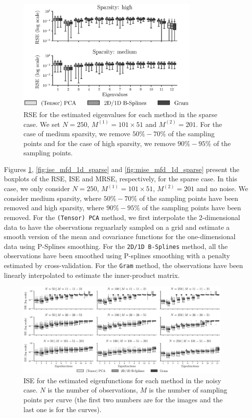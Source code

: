 \begin{figure}
    \centering
    \includegraphics[width=0.8\textwidth]{AE_sparse}
    \caption{RSE for the estimated eigenvalues for each method in the sparse case. We set $N = 250$, $M^{(1)} = 101 \times 51$ and $M^{(2)} = 201$. For the case of medium sparsity, we remove $50\%-70\%$ of the sampling points and for the case of high sparsity, we remove $90\%-95\%$ of the sampling points.}
    \label{fig:logAE_mfd_1d_sparse}
\end{figure}


Figures \ref{fig:logAE_mfd_1d_sparse}, \ref{fig:ise_mfd_1d_sparse} and \ref{fig:mise_mfd_1d_sparse} present the boxplots of the RSE, ISE and MRSE, respectively, for the sparse case. In this case, we only consider $N = 250$, $M^{(1)} = 101 \times 51$, $M^{(2)} = 201$ and no noise. We consider medium sparsity, where $50\%-70\%$ of the sampling points have been removed and high sparsity, where $90\%-95\%$ of the sampling points have been removed. For the \texttt{(Tensor) PCA} method, we first interpolate the 2-dimensional data to have the observations reguarlarly sampled on a grid and estimate a smooth version of the mean and covariance functions for the one-dimensional data using P-Splines smoothing. For the \texttt{2D/1D B-Splines} method, all the observations have been smoothed using P-splines smoothing with a penalty estimated by cross-validation. For the \texttt{Gram} method, the observations have been linearly interpolated to estimate the inner-product matrix.



\begin{figure}
     \centering
    \includegraphics[width=0.95\textwidth]{ISE_noise}
    \caption{ISE for the estimated eigenfunctions for each method in the noisy case. $N$ is the number of observations, $M$ is the number of sampling points per curve (the first two numbers are for the images and the last one is for the curves).}
    \label{fig:ise_mfd_1d_noise}
\end{figure}

